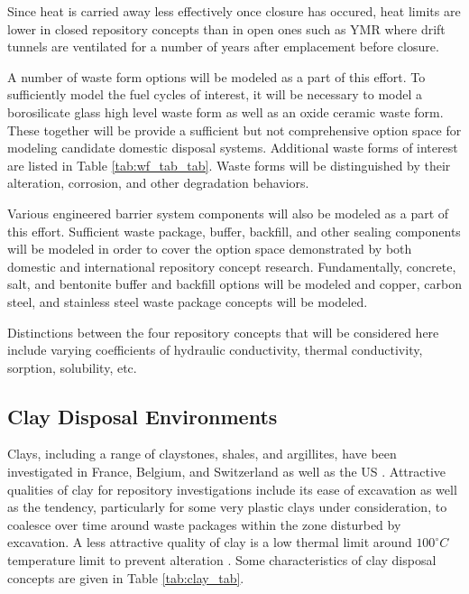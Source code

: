 Since heat is carried away less effectively once closure 
has occured, heat limits are lower in  closed repository concepts than in open 
ones such as \gls{YMR} where drift tunnels are ventilated for a number of years
after emplacement before closure.

A number of waste form options will be modeled as a part of this effort. To 
sufficiently model the fuel cycles of interest, it will be necessary to model 
a borosilicate glass high level waste form as well as an oxide ceramic waste 
form. These together will be provide a sufficient but not comprehensive option 
space for modeling candidate domestic disposal systems. Additional waste forms 
of interest are listed in Table \ref{tab:wf_tab_tab}. Waste forms will be 
distinguished by their alteration, corrosion, and other degradation behaviors.

Various engineered barrier system components will also be modeled as a part of 
this effort. Sufficient waste package, buffer, backfill, and other sealing 
components will be modeled in order to cover the option space demonstrated by 
both domestic and international repository concept research. Fundamentally, 
concrete, salt, and bentonite buffer and backfill options will be modeled and 
copper, carbon steel, and stainless steel waste package concepts will be 
modeled.

Distinctions between the four repository concepts that will be considered here 
include varying coefficients of hydraulic conductivity, thermal conductivity, 
sorption, solubility, etc.

\subsection{Clay Disposal Environments}

Clays, including a range of claystones, shales, and argillites, have been 
investigated in France, Belgium, and Switzerland as well as the  \gls{US} 
\cite{von_lensa_red-impact_2008, clayton_generic_2011}. Attractive qualities 
of clay for repository investigations include its ease of excavation as well as
the tendency, particularly for some very plastic clays under consideration, to 
coalesce over time around waste packages within the zone disturbed by 
excavation.  A less attractive quality of clay is a 
low thermal limit around $100^{\circ}C$ temperature limit to prevent alteration 
\cite{hardin_generic_2011}.
Some characteristics of clay disposal 
concepts are given in Table \ref{tab:clay_tab}.   

